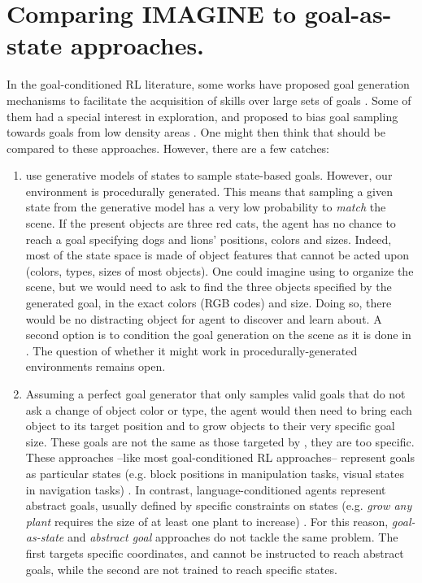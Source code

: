 \section{Comparing IMAGINE to goal-as-state approaches.}
\label{sec:suppl_discu}
In the goal-conditioned RL literature, some works have proposed goal generation mechanisms to facilitate the acquisition of skills over large sets of goals \cite{nair2018visual,pong2019skew,curious,nair2019contextual}. Some of them had a special interest in exploration, and proposed to bias goal sampling towards goals from low density areas \cite{pong2019skew}. One might then think that \imagine should be compared to these approaches. However, there are a few catches: 
\begin{enumerate}
    \item 
    \citet{nair2018visual,nair2019contextual,pong2019skew} use generative models of states to sample state-based goals. However, our environment is procedurally generated. This means that sampling a given state from the generative model has a very low probability to \textit{match} the scene. If the present objects are three red cats, the agent has no chance to reach a goal specifying dogs and lions' positions, colors and sizes. Indeed, most of the state space is made of  object features that cannot be acted upon (colors, types, sizes of most objects). One could imagine using \SP to organize the scene, but we would need to ask \SP to find the three objects specified by the generated goal, in the exact colors (RGB codes) and size. Doing so, there would be no distracting object for agent to discover and learn about. A second option is to condition the goal generation on the scene as it is done in \citet{nair2019contextual}. The question of whether it might work in procedurally-generated environments remains open.
    \item 
    Assuming a perfect goal generator that only samples valid goals that do not ask a change of object color or type, the agent would then need to bring each object to its target position and to grow objects to their very specific goal size. These goals are not the same as those targeted by \imagine, they are too specific. These approaches --like most goal-conditioned RL approaches-- represent goals as particular states (e.g. block positions in manipulation tasks, visual states in navigation tasks) \cite{schaul2015universal,andrychowicz2017hindsight,nair2018visual,pong2019skew,curious}. In contrast, language-conditioned agents represent abstract goals, usually defined by specific constraints on states (e.g. \textit{grow any plant} requires the size of at least one plant to increase) \cite{chan2019actrce,Jiang2019,ther}. 
    For this reason, \textit{goal-as-state} and \textit{abstract goal} approaches do not tackle the same problem. The first targets specific coordinates, and cannot be instructed to reach abstract goals, while the second are not trained to reach specific states.
\end{enumerate}

